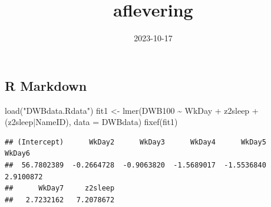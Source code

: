 \documentclass[
]{article}
\title{aflevering}
\author{}
\date{\vspace{-2.5em}2023-10-17}
\newenvironment{Shaded}{\begin{snugshade}}{\end{snugshade}}
\newcommand{\AttributeTok}[1]{\textcolor[rgb]{0.77,0.63,0.00}{#1}}
\newcommand{\FunctionTok}[1]{\textcolor[rgb]{0.00,0.00,0.00}{#1}}
\newcommand{\NormalTok}[1]{#1}
\newcommand{\OtherTok}[1]{\textcolor[rgb]{0.56,0.35,0.01}{#1}}
\newcommand{\SpecialCharTok}[1]{\textcolor[rgb]{0.00,0.00,0.00}{#1}}
\newcommand{\StringTok}[1]{\textcolor[rgb]{0.31,0.60,0.02}{#1}}
\begin{document}
\maketitle

\hypertarget{r-markdown}{%
\subsection{R Markdown}\label{r-markdown}}

\begin{Shaded}
\begin{Highlighting}[]
\FunctionTok{load}\NormalTok{(}\StringTok{"DWBdata.Rdata"}\NormalTok{)}
\NormalTok{fit1 }\OtherTok{\textless{}{-}} \FunctionTok{lmer}\NormalTok{(DWB100 }\SpecialCharTok{\textasciitilde{}}\NormalTok{ WkDay }\SpecialCharTok{+}\NormalTok{ z2sleep }\SpecialCharTok{+}\NormalTok{ (z2sleep}\SpecialCharTok{|}\NormalTok{NameID), }\AttributeTok{data =}\NormalTok{ DWBdata)}
\FunctionTok{fixef}\NormalTok{(fit1)}
\end{Highlighting}
\end{Shaded}

\begin{verbatim}
## (Intercept)      WkDay2      WkDay3      WkDay4      WkDay5      WkDay6 
##  56.7802389  -0.2664728  -0.9063820  -1.5689017  -1.5536840   2.9100872 
##      WkDay7     z2sleep 
##   2.7232162   7.2078672
\end{verbatim}
\end{document}
